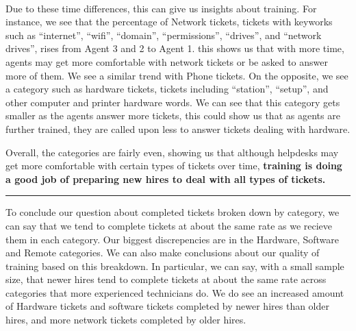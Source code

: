 \documentclass[11pt]{article}
\begin{document}
    \begin{center}
    \end{center}
    { \hspace*{\fill} \\}
    
    Due to these time differences, this can give us insights about training.
For instance, we see that the percentage of Network tickets, tickets
with keyworks such as ``internet'', ``wifi'', ``domain'',
``permissions'', ``drives'', and ``network drives'', rises from Agent 3
and 2 to Agent 1. this shows us that with more time, agents may get more
comfortable with network tickets or be asked to answer more of them. We
see a similar trend with Phone tickets. On the opposite, we see a
category such as hardware tickets, tickets including ``station'',
``setup'', and other computer and printer hardware words. We can see
that this category gets smaller as the agents answer more tickets, this
could show us that as agents are further trained, they are called upon
less to answer tickets dealing with hardware.

Overall, the categories are fairly even, showing us that although
helpdesks may get more comfortable with certain types of tickets over
time, \textbf{training is doing a good job of preparing new hires to
deal with all types of tickets.}

\begin{center}\rule{0.5\linewidth}{\linethickness}\end{center}

To conclude our question about completed tickets broken down by
category, we can say that we tend to complete tickets at about the same
rate as we recieve them in each category. Our biggest discrepencies are
in the Hardware, Software and Remote categories. We can also make
conclusions about our quality of training based on this breakdown. In
particular, we can say, with a small sample size, that newer hires tend
to complete tickets at about the same rate across categories that more
experienced technicians do. We do see an increased amount of Hardware
tickets and software tickets completed by newer hires than older hires,
and more network tickets completed by older hires.



    
\end{document}
